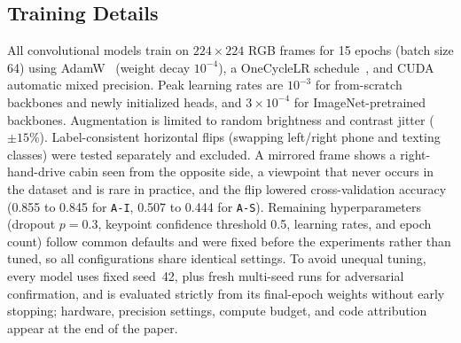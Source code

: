 \subsection{Training Details}
All convolutional models train on $224 \times 224$ RGB frames for 15 epochs (batch size 64) using AdamW~\cite{loshchilovAdamW2019} (weight decay $10^{-4}$), a OneCycleLR schedule~\cite{smithSuperconvergence2019}, and CUDA automatic mixed precision. Peak learning rates are $10^{-3}$ for from-scratch backbones and newly initialized heads, and $3 \times 10^{-4}$ for ImageNet-pretrained backbones. Augmentation is limited to random brightness and contrast jitter ($\pm 15\%$). Label-consistent horizontal flips (swapping left/right phone and texting classes) were tested separately and excluded. A mirrored frame shows a right-hand-drive cabin seen from the opposite side, a viewpoint that never occurs in the dataset and is rare in practice, and the flip lowered cross-validation accuracy (0.855 to 0.845 for \texttt{A-I}, 0.507 to 0.444 for \texttt{A-S}). Remaining hyperparameters (dropout $p = 0.3$, keypoint confidence threshold 0.5, learning rates, and epoch count) follow common defaults and were fixed before the experiments rather than tuned, so all configurations share identical settings. To avoid unequal tuning, every model uses fixed seed~42, plus fresh multi-seed runs for adversarial confirmation, and is evaluated strictly from its final-epoch weights without early stopping; hardware, precision settings, compute budget, and code attribution appear at the end of the paper.
